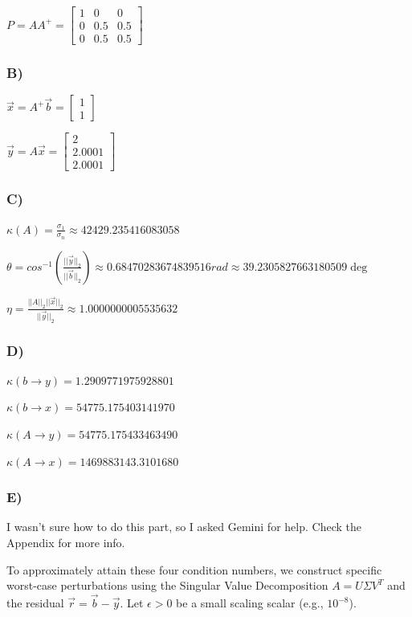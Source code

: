 \documentclass[11pt]{article}
\begin{document}
$P = AA^+ = \begin{bmatrix}
    1 & 0 & 0 \\
    0 & 0.5 & 0.5 \\
    0 & 0.5 & 0.5    
\end{bmatrix}$

\subsubsection*{B)}
$\vec{x} = A^+ \vec{b}=\begin{bmatrix}
    1 \\ 1
\end{bmatrix}$

$\vec{y} = A \vec{x} = \begin{bmatrix}
    2 \\ 2.0001 \\ 2.0001
\end{bmatrix}$

\newpage
\subsubsection*{C)}
$\kappa(A) = \frac{\sigma_1}{\sigma_n} \approx 42429.235416083058$

$\theta = cos^{-1}(\frac{||\vec{y}||_2}{||\vec{b}||_2}) \approx 0.68470283674839516 rad \approx 39.2305827663180509\deg$

$\eta = \frac{||A||_2 ||\vec{x}||_2}{||\vec{y}||_2} \approx 1.0000000005535632$

\subsubsection*{D)}
$\kappa(b \rightarrow{} y) = 1.2909771975928801$

$\kappa(b \rightarrow{} x) = 54775.175403141970$

$\kappa(A \rightarrow{} y) = 54775.175433463490$

$\kappa(A \rightarrow{} x) = 1469883143.3101680$

\subsubsection*{E)}
I wasn't sure how to do this part, so I asked Gemini for help. Check the Appendix for more info.

To approximately attain these four condition numbers, we construct specific worst-case perturbations using the Singular Value Decomposition $A = U \Sigma V^T$ and the residual $\vec{r} = \vec{b} - \vec{y}$. Let $\epsilon > 0$ be a small scaling scalar (e.g., $10^{-8}$). 
\end{document}
